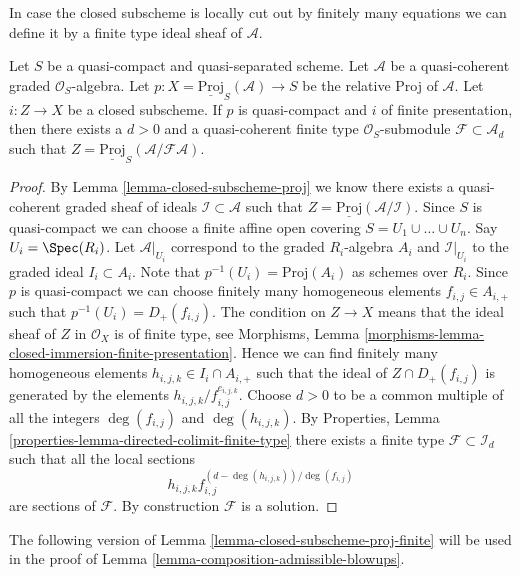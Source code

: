 \noindent
In case the closed subscheme is locally cut out by finitely many
equations we can define it by a finite type ideal sheaf of
$\mathcal{A}$.

\begin{lemma}
\label{lemma-closed-subscheme-proj-finite}
Let $S$ be a quasi-compact and quasi-separated scheme.
Let $\mathcal{A}$ be a quasi-coherent graded $\mathcal{O}_S$-algebra. Let
$p : X = \underline{\text{Proj}}_S(\mathcal{A}) \to S$ be the relative
Proj of $\mathcal{A}$. Let $i : Z \to X$ be a closed subscheme.
If $p$ is quasi-compact and $i$ of finite presentation, then there exists
a $d > 0$ and a quasi-coherent finite type $\mathcal{O}_S$-submodule
$\mathcal{F} \subset \mathcal{A}_d$ such that
$Z = \underline{\text{Proj}}_S(\mathcal{A}/\mathcal{F}\mathcal{A})$.
\end{lemma}

\begin{proof}
By Lemma \ref{lemma-closed-subscheme-proj} we know there exists a
quasi-coherent graded sheaf of ideals $\mathcal{I} \subset \mathcal{A}$
such that $Z = \underline{\text{Proj}}(\mathcal{A}/\mathcal{I})$.
Since $S$ is quasi-compact we can choose a finite affine open covering
$S = U_1 \cup \ldots \cup U_n$. Say $U_i = \Spec(R_i)$. Let
$\mathcal{A}|_{U_i}$ correspond to the graded $R_i$-algebra $A_i$ and
$\mathcal{I}|_{U_i}$ to the graded ideal $I_i \subset A_i$. Note that
$p^{-1}(U_i) = \text{Proj}(A_i)$ as schemes over $R_i$.
Since $p$ is quasi-compact we can choose finitely many homogeneous
elements $f_{i, j} \in A_{i, +}$ such that $p^{-1}(U_i) = D_{+}(f_{i, j})$.
The condition on $Z \to X$ means that the ideal sheaf of $Z$ in
$\mathcal{O}_X$ is of finite type, see
Morphisms, Lemma \ref{morphisms-lemma-closed-immersion-finite-presentation}.
Hence we can find finitely many homogeneous elements
$h_{i, j, k} \in I_i \cap A_{i, +}$ such that the ideal of
$Z \cap D_{+}(f_{i, j})$ is generated by the elements
$h_{i, j, k}/f_{i, j}^{e_{i, j, k}}$. Choose $d > 0$ to be a common multiple
of all the integers $\deg(f_{i, j})$ and $\deg(h_{i, j, k})$.
By Properties, Lemma \ref{properties-lemma-directed-colimit-finite-type}
there exists a finite type $\mathcal{F} \subset \mathcal{I}_d$
such that all the local sections
$$
h_{i, j, k}f_{i, j}^{(d - \deg(h_{i, j, k}))/\deg(f_{i, j})}
$$
are sections of $\mathcal{F}$. By construction $\mathcal{F}$ is a solution.
\end{proof}

\noindent
The following version of Lemma \ref{lemma-closed-subscheme-proj-finite}
will be used in the proof of
Lemma \ref{lemma-composition-admissible-blowups}.

